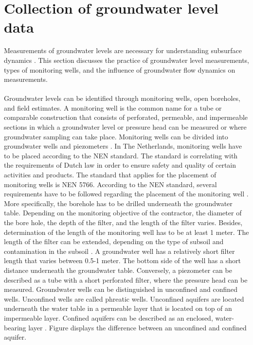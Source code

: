 \section{Collection of groundwater level data}
Measurements of groundwater levels are necessary for understanding subsurface dynamics \cite{hendriks-2023}. This section discusses the practice of groundwater level measurements, types of monitoring wells, and the influence of groundwater flow dynamics on measurements. \\
\\
Groundwater levels can be identified through monitoring wells, open boreholes, and field estimates. A monitoring well is the common name for a tube or comparable construction that consists of perforated, permeable, and impermeable sections in which a groundwater level or pressure head can be measured or where groundwater sampling can take place. Monitoring wells can be divided into groundwater wells and piezometers \cite{ritzema-2012}. In The Netherlands, monitoring wells have to be placed according to the NEN standard. The standard is correlating with the requirements of Dutch law in order to ensure safety and quality of certain activities and products. The standard that applies for the placement of monitoring wells is NEN 5766\cite{stichting-infrastructuur-kwaliteitsborging-bodembeheer-2013}. According to the NEN standard, several requirements have to be followed regarding the placement of the monitoring well \cite{stichting-infrastructuur-kwaliteitsborging-bodembeheer-2013}. More specifically, the borehole has to be drilled underneath the groundwater table. Depending on the monitoring objective of the contractor, the diameter of the bore hole, the depth of the filter, and the length of the filter varies. Besides, determination of the length of the monitoring well has to be at least 1 meter. The length of the filter can be extended, depending on the type of subsoil and contamination in the subsoil \cite{stichting-infrastructuur-kwaliteitsborging-bodembeheer-2013}. A groundwater well has a relatively short filter length that varies between 0.5-1 meter. The bottom side of the well has a short distance underneath the groundwater table. 
Conversely, a piezometer can be described as a tube with a short perforated filter, where the pressure head can be measured. Groundwater wells can be distinguished in unconfined and confined wells. Unconfined wells are called phreatic wells. Unconfined aquifers are located underneath the water table in a permeable layer that is located on top of an impermeable layer. Confined aquifers can be described as an enclosed, water-bearing layer \cite{tno-1996}. Figure  displays the difference between an unconfined and confined aquifer. 
